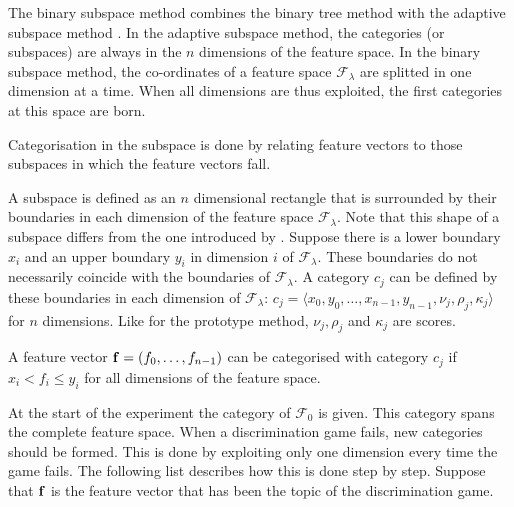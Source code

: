 The binary subspace method combines the binary tree method with the adaptive subspace method \citep{dejongvogt:1998,dejong:2000}. In the adaptive subspace method, the categories (or subspaces) are always in the $n$ dimensions of the feature space. In the binary subspace method, the co-ordinates of a feature space ${\mathcal F}_\lambda$ are splitted in one dimension at a time. When all dimensions are thus exploited, the first categories at this space are born.

Categorisation in the subspace is done by relating feature vectors to those subspaces in which the feature vectors fall.


A subspace is defined as an $n$ dimensional rectangle that is surrounded by their boundaries in each dimension of the feature space ${\mathcal F}_\lambda$. Note that this shape of a subspace differs from the one introduced by \citet{oja:83}. Suppose there is a lower boundary $x_i$ and an upper boundary $y_i$ in dimension $i$ of ${\mathcal F}_\lambda$. These boundaries do not necessarily coincide with the boundaries of ${\mathcal F}_\lambda$. A category $c_j$ can be defined by these boundaries in each dimension of ${\mathcal F}_\lambda$: $c_j=\langle x_0, y_0, \ldots, x_{n-1}, y_{n-1}, \nu_j, \rho_j, \kappa_j \rangle$ for $n$ dimensions. Like for the prototype method, $\nu_j,\rho_j$ and $\kappa_j$ are scores.

A feature vector ${\bf f}=(f_0,\ldots,f_{n-1})$ can be categorised with category $c_j$ if $x_i < f_i \leq y_i$ for all dimensions of the feature space.

At the start of the experiment the category of ${\mathcal F}_0$ is given. This category spans the complete feature space. When a discrimination game fails, new categories should be formed. This is done by exploiting only one dimension every time the game fails. The following list describes how this is done step by step. Suppose that ${\bf f}$ is the feature vector that has been the topic of the discrimination game.

